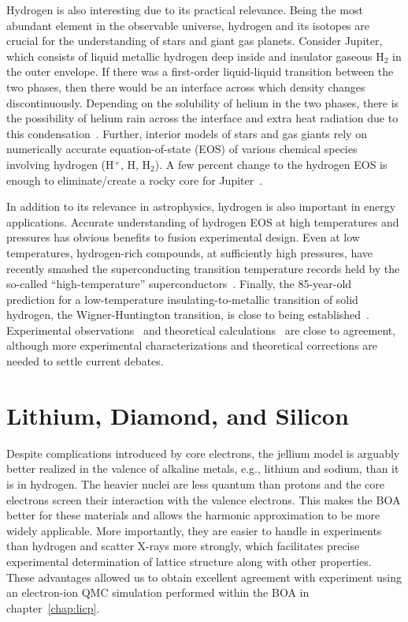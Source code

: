 Hydrogen is also interesting due to its practical relevance. Being the most abundant element in the observable universe, hydrogen and its isotopes are crucial for the understanding of stars and giant gas planets.
Consider Jupiter, which consists of liquid metallic hydrogen deep inside and insulator gaseous H$_2$ in the outer envelope. If there was a first-order liquid-liquid transition between the two phases, then there would be an interface across which density changes discontinuously.
Depending on the solubility of helium in the two phases, there is the possibility of helium rain across the interface and extra heat radiation due to this condensation~\cite{Militzer_thesis}.
Further, interior models of stars and gas giants rely on numerically accurate equation-of-state (EOS) of various chemical species involving hydrogen (H$^+$, H, H$_2$).
A few percent change to the hydrogen EOS is enough to eliminate/create a rocky core for Jupiter~\cite{Hubbard2016}.

In addition to its relevance in astrophysics, hydrogen is also important in energy applications. Accurate understanding of hydrogen EOS at high temperatures and pressures has obvious benefits to fusion experimental design.
Even at low temperatures, hydrogen-rich compounds, at sufficiently high pressures, have recently smashed the superconducting transition temperature records held by the so-called ``high-temperature'' superconductors~\cite{Drozdov2015,Errea2020}.
Finally, the 85-year-old prediction for a low-temperature insulating-to-metallic transition of solid hydrogen, the Wigner-Huntington transition, is close to being established~\cite{Wigner1935,Dias2016,Loubeyre2020}.
Experimental observations~\cite{Dias2016,Loubeyre2020} and theoretical calculations~\cite{McMinis2015,Gorelov2019} are close to agreement, although more experimental characterizations and theoretical corrections are needed to settle current debates.


\section{Lithium, Diamond, and Silicon}
Despite complications introduced by core electrons, the jellium model is arguably better realized in the valence of alkaline metals, e.g., lithium and sodium, than it is in hydrogen.
The heavier nuclei are less quantum than protons and the core electrons screen their interaction with the valence electrons.
This makes the BOA better for these materials and allows the harmonic approximation to be more widely applicable.
More importantly, they are easier to handle in experiments than hydrogen and scatter X-rays more strongly, which facilitates precise experimental determination of lattice structure along with other properties.
These advantages allowed us to obtain excellent agreement with experiment using an electron-ion QMC simulation performed within the BOA in chapter~\ref{chap:licp}.

